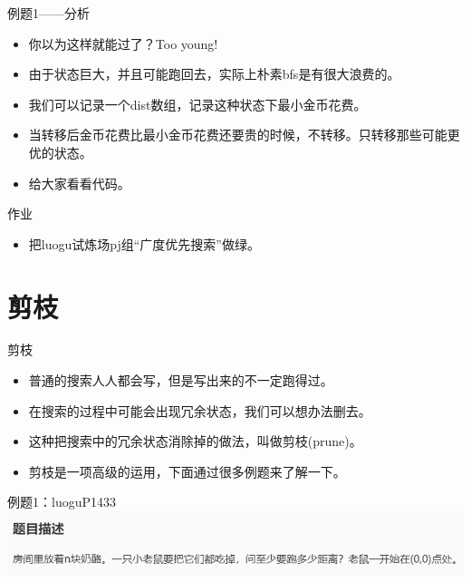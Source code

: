 \documentclass{beamer}[UTF-8]
\begin{document}
\begin{frame}{例题1——分析}
  \pause
\begin{itemize}
\item 你以为这样就能过了？Too young! \pause
\item 由于状态巨大，并且可能跑回去，实际上朴素bfs是有很大浪费的。 \pause
\item 我们可以记录一个dist数组，记录这种状态下最小金币花费。 \pause
\item 当转移后金币花费比最小金币花费还要贵的时候，不转移。只转移那些可能更优的状态。 \pause
\item 给大家看看代码。
\end{itemize}
\end{frame}

\begin{frame}{作业}
\begin{itemize}
  \item 把luogu试炼场pj组“广度优先搜索”做绿。
\end{itemize}
\end{frame}

\section{剪枝}

\begin{frame}{剪枝}
  \pause
\begin{itemize}
\item 普通的搜索人人都会写，但是写出来的不一定跑得过。 \pause
\item 在搜索的过程中可能会出现冗余状态，我们可以想办法删去。 \pause
\item 这种把搜索中的冗余状态消除掉的做法，叫做剪枝(prune)。 \pause
\item 剪枝是一项高级的运用，下面通过很多例题来了解一下。
\end{itemize}
\end{frame}

\begin{frame}{例题1：luoguP1433}
\includegraphics[width=\textwidth]{luoguP1433.png}
\end{frame}
\end{document}
